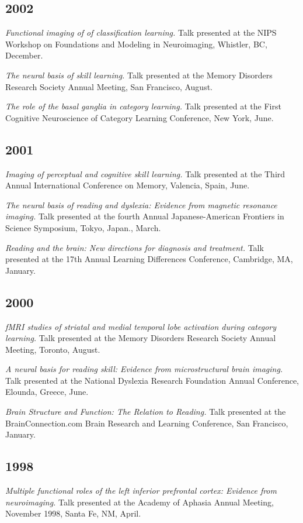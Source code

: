 \documentclass[10pt, letterpaper]{article}
\begin{document}
\subsection*{2002}\textit{Functional imaging of of classification learning.} Talk presented at the NIPS Workshop on Foundations and Modeling in Neuroimaging, Whistler, BC, December.

\textit{The neural basis of skill learning.} Talk presented at the Memory Disorders Research Society Annual Meeting, San Francisco, August.

\textit{ The role of the basal ganglia in category learning.} Talk presented at the First Cognitive Neuroscience of Category Learning Conference, New York, June.

\subsection*{2001}\textit{Imaging of perceptual and cognitive skill learning.} Talk presented at the Third Annual International Conference on Memory, Valencia, Spain, June.

\textit{The neural basis of reading and dyslexia: Evidence from magnetic resonance imaging.} Talk presented at the fourth Annual Japanese-American Frontiers in Science Symposium, Tokyo, Japan., March.

\textit{Reading and the brain: New directions for diagnosis and treatment.} Talk presented at the 17th Annual Learning Differences Conference, Cambridge, MA, January.

\subsection*{2000}\textit{fMRI studies of striatal and medial temporal lobe activation during category learning.} Talk presented at the Memory Disorders Research Society Annual Meeting, Toronto, August.

\textit{A neural basis for reading skill: Evidence from microstructural brain imaging.} Talk presented at the National Dyslexia Research Foundation Annual Conference, Elounda, Greece, June.

\textit{Brain Structure and Function: The Relation to Reading.} Talk presented at the BrainConnection.com Brain Research and Learning Conference, San Francisco, January.

\subsection*{1998}\textit{Multiple functional roles of the left inferior prefrontal cortex: Evidence from neuroimaging.} Talk presented at the Academy of Aphasia Annual Meeting, November 1998, Santa Fe, NM, April.
\end{document}
